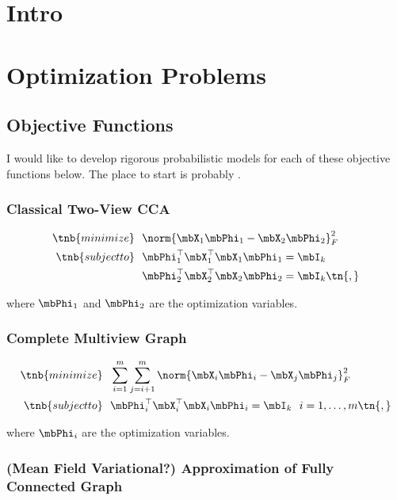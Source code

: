 \documentclass{article}
\begin{document}
\section{Intro} \label{sec:intro}
\section{Optimization Problems} \label{sec:model}

	\subsection{Objective Functions} \label{subsec:objective}
	I would like to develop rigorous probabilistic models for each of these objective functions below. The place to start is probably \cite{bach2005probabilistic}.
	
	\subsubsection{Classical Two-View CCA} \label{subsubsec:classicalcca}
	
	\begin{align*}
		\tnb{minimize}&\ \ \norm{\mbX_1 \mbPhi_1 - \mbX_2 \mbPhi_2}_F^2\\
		\tnb{subject to}&\ \  \mbPhi_1^{\top}\mbX_1^{\top}\mbX_1\mbPhi_1 = \mbI_k\\
		&\ \ \mbPhi_2^{\top}\mbX_2^{\top}\mbX_2\mbPhi_2 = \mbI_k \tn{,}
	\end{align*}
	
	\noindent where $\mbPhi_1$ and $\mbPhi_2$ are the optimization variables.
	
	\subsubsection{Complete Multiview Graph} \label{subsubsec:cgraph}
	
	\begin{align*}
		\tnb{minimize}&\ \ \sum_{i=1}^m \sum_{j=i+1}^m \norm{\mbX_i \mbPhi_i - \mbX_j \mbPhi_j}_F^2\\
		\tnb{subject to}&\ \  \mbPhi_i^{\top}\mbX_i^{\top}\mbX_i\mbPhi_i = \mbI_k\ \ i=1,\ldots,m \tn{,}
	\end{align*}
	
	\noindent where $\mbPhi_i$ are the optimization variables.
	
	\subsubsection{(Mean Field Variational?) Approximation of Fully Connected Graph} \label{subsubsec:approxfcgraph}
	
\end{document}
